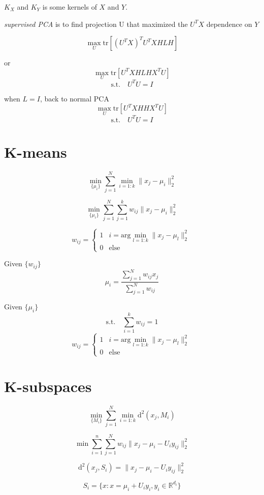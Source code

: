 \documentclass[12pt,a4paper]{article}
\begin{document}
$K_X$ and $K_Y$ is some kernels of $X$ and $Y$.

\textit{supervised PCA} is to find projection U that maximized the $U^TX$ dependence on $Y$ 

\[
\max_U \mathrm{tr}[(U^TX)^TU^TX HLH]
\]

or 
\[
\max_U \mathrm{tr}[U^TXHLHX^TU]
\]
\[
	\mbox{s.t.} \quad U^TU = I
\]

when $L = I$, back to normal PCA
\[
\max_U \mathrm{tr}[U^TXHHX^TU]
\]
\[
	\mbox{s.t.} \quad U^TU = I
\]

\section{K-means}
\[
 \min_{\{\mu_i\}} \sum_{j =1}^{N} \min_{i=1:k} \|x_j-\mu_i\|^2_2
\]

\[
 \min_{\{\mu_i\}} \sum_{j =1}^{N} \sum_{j=1}^{k} w_{ij} \|x_j-\mu_i\|^2_2
\]

\[
	w_{ij} = \begin{cases}
	1 & i = \mathrm{arg}\min_{l=1:k} \|x_j-\mu_l\|^2_2 \\
	0 & \mbox{else}
	\end{cases}
\]


Given $\{w_{ij}\}$
\[
	\mu_i = \frac{\sum_{j=1}^N w_{ij}x_j}{\sum_{j=1}^N w_{ij}}
\]



Given $\{\mu_i\}$
\[
	\mbox{s.t.} \quad \sum_{i=1}^{k} w_{ij} = 1
\]
\[
	w_{ij} = \begin{cases}
	1 & i = \mathrm{arg}\min_{l=1:k} \|x_j-\mu_l\|^2_2 \\
	0 & \mbox{else}
	\end{cases}
\]


\section{K-subspaces}
\[
 \min_{ \{ M_i \} } \sum_{j =1}^{N} \min_{i=1:k} \mathrm{d}^2(x_j,M_i)
\]


\[
 \min \sum_{i=1}^{n} \sum_{j=1}^{N} w_{ij} \|x_j - \mu_i -U_i y_{ij}\|_2^2
\]

\[
	\mathrm{d}^2(x_j,S_i) = \|x_j - \mu_i -U_i y_{ij}\|_2^2
\]

\[
	S_i = \{x: x = \mu_i + U_i y_i, y_i \in \mathbb{R}^{d_i}\}
\]
\end{document}
